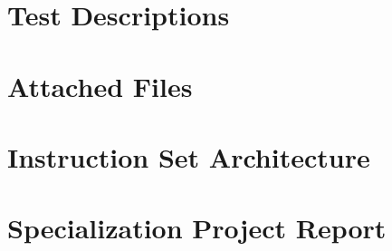 \documentclass[a4paper,twoside,12pt]{book}
\begin{document}
\cleardoublepage
{}
{}



\appendix

\chapter{Test Descriptions}
    \label{app:test-descriptions}
    

\chapter{Attached Files}
    \label{app:attached-files}
    

\chapter{Instruction Set Architecture}
    \label{app:isa}
    \cleardoublepage
    

\chapter{Specialization Project Report}
    \label{app:specialization-project}
    \cleardoublepage
    
\end{document}
